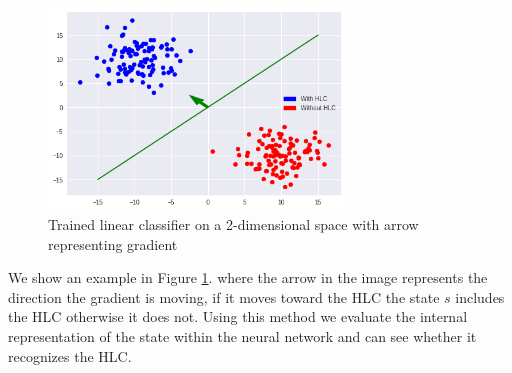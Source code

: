 \begin{figure}[]
    \centering
    \includegraphics[width=0.7\textwidth]{graphics/linear_separation_with_direction}
    \caption{Trained linear classifier on a 2-dimensional space with arrow representing gradient}
    \label{fig:scattersplitarrow}
\end{figure}

We show an example in Figure \ref{fig:scattersplitarrow}. where the arrow in the image represents the direction the gradient is moving, if it moves toward the HLC the state $s$ includes the HLC otherwise it does not. Using this method we evaluate the internal representation of the state within the neural network and can see whether it recognizes the HLC. 


